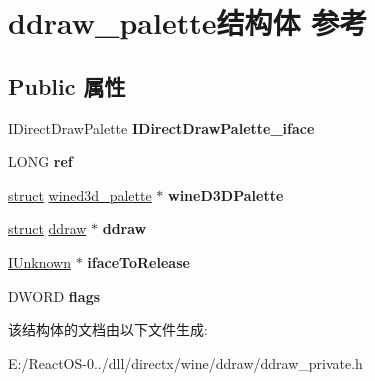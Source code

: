 \hypertarget{structddraw__palette}{}\section{ddraw\+\_\+palette结构体 参考}
\label{structddraw__palette}
\subsection*{Public 属性}
\begin{DoxyCompactItemize}
\item 
\mbox{\label{structddraw__palette_aeb6d152c140a5e3851cd06022d501c06}} 
I\+Direct\+Draw\+Palette {\bfseries I\+Direct\+Draw\+Palette\+\_\+iface}
\item 
\mbox{\label{structddraw__palette_ad5a6fcc861974edf90ecf118548a3765}} 
L\+O\+NG {\bfseries ref}
\item 
\mbox{\label{structddraw__palette_a0c3ca8466f02bd306d82fd9d70590122}} 
\hyperlink{interfacestruct}{struct} \hyperlink{structwined3d__palette}{wined3d\+\_\+palette} $\ast$ {\bfseries wine\+D3\+D\+Palette}
\item 
\mbox{\label{structddraw__palette_afb8edc69a65d82f8bb199209ede2abdb}} 
\hyperlink{interfacestruct}{struct} \hyperlink{structddraw}{ddraw} $\ast$ {\bfseries ddraw}
\item 
\mbox{\label{structddraw__palette_a908133f1cba30b914b06311dbfd7088f}} 
\hyperlink{interface_i_unknown}{I\+Unknown} $\ast$ {\bfseries iface\+To\+Release}
\item 
\mbox{\label{structddraw__palette_a7fbeca9d3124c6437840493847d3ddcb}} 
D\+W\+O\+RD {\bfseries flags}
\end{DoxyCompactItemize}


该结构体的文档由以下文件生成\+:\begin{DoxyCompactItemize}
\item 
E\+:/\+React\+O\+S-\/0../dll/directx/wine/ddraw/ddraw\+\_\+private.\+h\end{DoxyCompactItemize}
